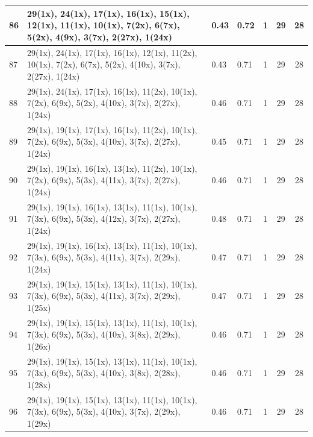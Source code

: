 \begin{small}
\begin{longtable}{|p{0.5cm}|p{9cm}|p{1.3cm}|p{1.3cm}|c|c|c|}
  86 & 29(1x), 24(1x), 17(1x), 16(1x), 15(1x), 12(1x), 11(1x), 10(1x), 7(2x), 6(7x), 5(2x), 4(9x), 3(7x), 2(27x), 1(24x) & \cellcolor{colorGood}  0.43 & \cellcolor{colorGood} 0.72 & 1 & 29 & \cellcolor{colorBad} 28 \\   \hline
  87 & 29(1x), 24(1x), 17(1x), 16(1x), 12(1x), 11(2x), 10(1x), 7(2x), 6(7x), 5(2x), 4(10x), 3(7x), 2(27x), 1(24x) & \cellcolor{colorGood}  0.43 & \cellcolor{colorGood} 0.71 & 1 & 29 & \cellcolor{colorBad} 28 \\   \hline
  88 & 29(1x), 24(1x), 17(1x), 16(1x), 11(2x), 10(1x), 7(2x), 6(9x), 5(2x), 4(10x), 3(7x), 2(27x), 1(24x) & \cellcolor{colorGood}  0.46 & \cellcolor{colorGood} 0.71 & 1 & 29 & \cellcolor{colorBad} 28 \\   \hline
  89 & 29(1x), 19(1x), 17(1x), 16(1x), 11(2x), 10(1x), 7(2x), 6(9x), 5(3x), 4(10x), 3(7x), 2(27x), 1(24x) & \cellcolor{colorGood}  0.45 & \cellcolor{colorGood} 0.71 & 1 & 29 & \cellcolor{colorBad} 28 \\   \hline
  90 & 29(1x), 19(1x), 16(1x), 13(1x), 11(2x), 10(1x), 7(2x), 6(9x), 5(3x), 4(11x), 3(7x), 2(27x), 1(24x) & \cellcolor{colorGood}  0.46 & \cellcolor{colorGood} 0.71 & 1 & 29 & \cellcolor{colorBad} 28 \\   \hline
  91 & 29(1x), 19(1x), 16(1x), 13(1x), 11(1x), 10(1x), 7(3x), 6(9x), 5(3x), 4(12x), 3(7x), 2(27x), 1(24x) & \cellcolor{colorGood}  0.48 & \cellcolor{colorGood} 0.71 & 1 & 29 & \cellcolor{colorBad} 28 \\   \hline
  92 & 29(1x), 19(1x), 16(1x), 13(1x), 11(1x), 10(1x), 7(3x), 6(9x), 5(3x), 4(11x), 3(7x), 2(29x), 1(24x) & \cellcolor{colorGood}  0.47 & \cellcolor{colorGood} 0.71 & 1 & 29 & \cellcolor{colorBad} 28 \\   \hline
  93 & 29(1x), 19(1x), 15(1x), 13(1x), 11(1x), 10(1x), 7(3x), 6(9x), 5(3x), 4(11x), 3(7x), 2(29x), 1(25x) & \cellcolor{colorGood}  0.47 & \cellcolor{colorGood} 0.71 & 1 & 29 & \cellcolor{colorBad} 28 \\   \hline
  94 & 29(1x), 19(1x), 15(1x), 13(1x), 11(1x), 10(1x), 7(3x), 6(9x), 5(3x), 4(10x), 3(8x), 2(29x), 1(26x) & \cellcolor{colorGood}  0.46 & \cellcolor{colorGood} 0.71 & 1 & 29 & \cellcolor{colorBad} 28 \\   \hline
  95 & 29(1x), 19(1x), 15(1x), 13(1x), 11(1x), 10(1x), 7(3x), 6(9x), 5(3x), 4(10x), 3(8x), 2(28x), 1(28x) & \cellcolor{colorGood}  0.46 & \cellcolor{colorGood} 0.71 & 1 & 29 & \cellcolor{colorBad} 28 \\   \hline
  96 & 29(1x), 19(1x), 15(1x), 13(1x), 11(1x), 10(1x), 7(3x), 6(9x), 5(3x), 4(10x), 3(7x), 2(29x), 1(29x) & \cellcolor{colorGood}  0.46 & \cellcolor{colorGood} 0.71 & 1 & 29 & \cellcolor{colorBad} 28 \\   \hline

\end{longtable}
\end{small}

